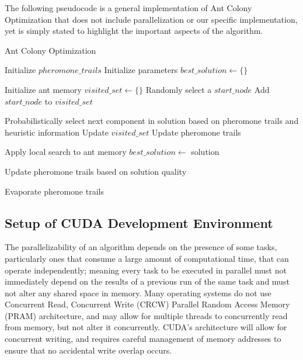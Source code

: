 \documentclass[11pt]{report}
\begin{document}
            The following pseudocode is a general implementation of Ant Colony Optimization that does not include parallelization or our specific implementation, yet is simply stated to highlight the important aspects of the algorithm.
            \begin{algorithm}[!h]
                \DontPrintSemicolon
                \caption{Ant Colony Optimization}
                \label{alg:aco}
                \KwResult{}
            
                Initialize $pheromone\_trails$\;
                Initialize parameters\;
                $best\_solution\gets\{\}$\;
                {
                    {
                        Initialize ant memory\;
                        $visited\_set\gets\{\}$\;
                        Randomly select a $start\_node$\;
                        Add $start\_node$ to $visited\_set$\;
            
                        {
                            Probabilistically select next component in solution based on pheromone trails and heuristic information\;
                            Update $visited\_set$\;
                            Update pheromone trails\;
                        }
                    
                        Apply local search to ant memory\;
                        {
                            $best\_solution\gets$ solution\;
                        }
                    
                        Update pheromone trails based on solution quality\;
                    }
                    Evaporate pheromone trails\;
                }
                
            \end{algorithm}

        
        \subsection{Setup of CUDA Development Environment}
            The parallelizability of an algorithm depends on the presence of some tasks, particularly ones that consume a large amount of computational time, that can operate independently; meaning every task to be executed in parallel must not immediately depend on the results of a previous run of the same task and must not alter any shared space in memory. Many operating systems do not use Concurrent Read, Concurrent Write (CRCW) Parallel Random Access Memory (PRAM) architecture, and may allow for multiple threads to concurrently read from memory, but not alter it concurrently. CUDA's architecture will allow for concurrent writing, and requires careful management of memory addresses to ensure that no accidental write overlap occurs.
            
\end{document}
